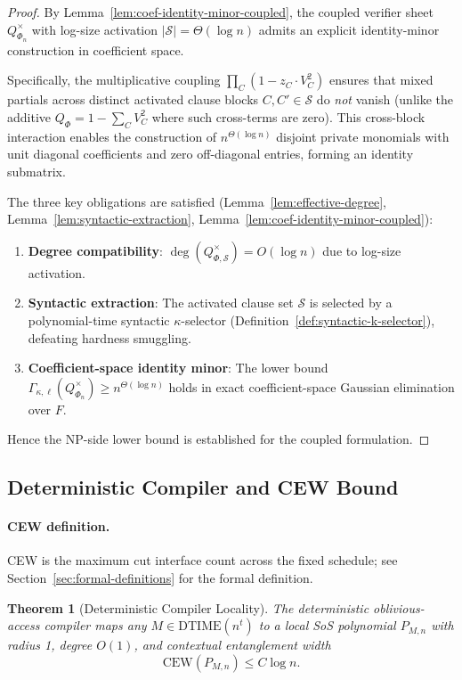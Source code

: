 \documentclass[12pt]{article}
\newtheorem{theorem}{Theorem}
\theoremstyle{definition}
\theoremstyle{definition}
\theoremstyle{remark}
\theoremstyle{remark}
\begin{document}
\begin{proof}
By Lemma~\ref{lem:coef-identity-minor-coupled}, the coupled verifier sheet $Q_{\Phi_n}^{\times}$ with log-size activation $|\mathcal{S}| = \Theta(\log n)$ admits an explicit identity-minor construction in coefficient space.

Specifically, the multiplicative coupling $\prod_C (1 - z_C \cdot V_C^2)$ ensures that mixed partials across distinct activated clause blocks $C, C' \in \mathcal{S}$ do \emph{not} vanish (unlike the additive $Q_\Phi = 1 - \sum_C V_C^2$ where such cross-terms are zero). This cross-block interaction enables the construction of $n^{\Theta(\log n)}$ disjoint private monomials with unit diagonal coefficients and zero off-diagonal entries, forming an identity submatrix.

The three key obligations are satisfied (Lemma~\ref{lem:effective-degree}, Lemma~\ref{lem:syntactic-extraction}, Lemma~\ref{lem:coef-identity-minor-coupled}):
\begin{enumerate}
\item \textbf{Degree compatibility}: $\deg(Q_{\Phi,\mathcal{S}}^{\times}) = O(\log n)$ due to log-size activation.
\item \textbf{Syntactic extraction}: The activated clause set $\mathcal{S}$ is selected by a polynomial-time syntactic $\kappa$-selector (Definition~\ref{def:syntactic-k-selector}), defeating hardness smuggling.
\item \textbf{Coefficient-space identity minor}: The lower bound $\Gamma_{\kappa,\ell}(Q_{\Phi_n}^{\times}) \geq n^{\Theta(\log n)}$ holds in exact coefficient-space Gaussian elimination over $F$.
\end{enumerate}

Hence the NP-side lower bound is established for the coupled formulation.
\end{proof}

\subsection{Deterministic Compiler and CEW Bound}
\label{sec:compiler}

\paragraph{CEW definition.}
CEW is the maximum cut interface count across the fixed schedule; see Section~\ref{sec:formal-definitions} for the formal definition.

\begin{theorem}[Deterministic Compiler Locality]\label{thm:det-compiler-formal}
The deterministic oblivious-access compiler maps any $M \in \mathrm{DTIME}(n^t)$
to a local SoS polynomial $P_{M,n}$ with radius 1,
degree $O(1)$,
and contextual entanglement width
\[
\mathrm{CEW}(P_{M,n}) \leq C \log n.
\]
\end{theorem}
\end{document}
